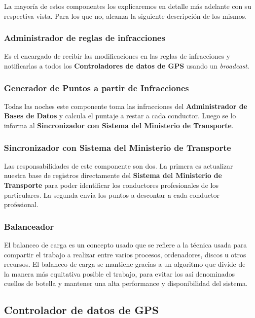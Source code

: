 La mayoría de estos componentes los explicaremos en detalle más adelante con su 
respectiva vista. Para los que no, alcanza la siguiente descripción de los 
mismos.


\subsubsection{Administrador de reglas de infracciones}

Es el encargado de recibir las modificaciones en las reglas de infracciones y 
notificarlas a todos los \textbf{Controladores de datos de GPS} usando un \textit{broadcast}.

\subsubsection{Generador de Puntos a partir de Infracciones}

Todas las noches este componente toma las infracciones del \textbf{Administrador de Bases de Datos} 
y calcula el puntaje a restar a cada conductor. Luego se lo informa al
\textbf{Sincronizador con Sistema del Ministerio de Transporte}.

\subsubsection{Sincronizador con Sistema del Ministerio de Transporte}

Las responsabilidades de este componente son dos.
La primera es actualizar nuestra base de registros directamente del \textbf{Sistema del Ministerio de Transporte}
para poder identificar los conductores profesionales de los particulares. 
La segunda envia los puntos a descontar a cada conductor profesional.

\subsubsection{Balanceador}
El balanceo de carga es un concepto usado que se refiere a la técnica usada para compartir el trabajo
a realizar entre varios procesos, ordenadores, discos u otros recursos.
El balanceo de carga se mantiene gracias a un algoritmo que divide de la manera más equitativa posible
el trabajo, para evitar los así denominados cuellos de botella y mantener una 
alta performance y disponibilidad del sistema.


\subsection{Controlador de datos de GPS}

